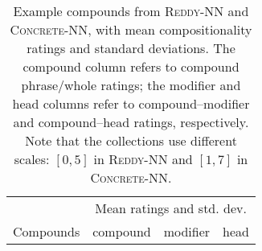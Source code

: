 \documentclass[output=paper,colorlinks,citecolor=brown]{langscibook}
\begin{document}
\begin{table}
\small
\caption{Example compounds from \textsc{Reddy-NN} and \textsc{Concrete-NN}, with mean compositionality ratings and standard deviations. The compound column refers to compound phrase/whole ratings; the modifier and head columns refer to compound--modifier and compound--head ratings, respectively. Note that the collections use different scales: $[0,5]$ in \textsc{Reddy-NN} and $[1,7]$ in \textsc{Concrete-NN}.}
\label{tab:ex-compounds}
  \begin{tabular}{l ccc}
  \lsptoprule
                & \multicolumn{3}{c}{Mean ratings and std. dev.} \\\cmidrule(lr){2-4}
      Compounds & \multicolumn{1}{c}{compound} & \multicolumn{1}{c}{modifier} & \multicolumn{1}{c}{head} \\
      \midrule


\end{tabular}
\end{table}
\end{document}
